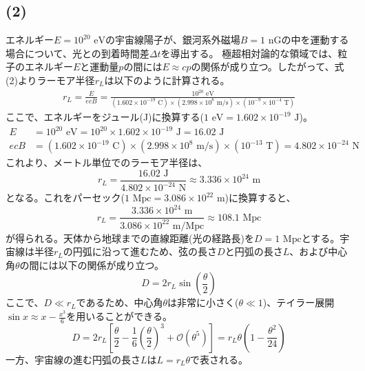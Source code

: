 \documentclass[a4paper,11pt]{jsarticle}
\begin{document}
\subsection*{(2)}
エネルギー$E = 10^{20}\text{ eV}$の宇宙線陽子が、銀河系外磁場$B = 1\text{ nG}$の中を運動する場合について、光との到着時間差$\Delta t$を導出する。
極超相対論的な領域では、粒子のエネルギー$E$と運動量$p$の間には$E \approx c p$の関係が成り立つ。したがって、式(2)よりラーモア半径$r_L$は以下のように計算される。
\begin{align}
    r_L = \frac{E}{e c B} = \frac{10^{20}\text{ eV}}{(1.602 \times 10^{-19}\text{ C}) \times (2.998 \times 10^8\text{ m/s}) \times (10^{-9} \times 10^{-4}\text{ T})}
\end{align}
ここで、エネルギーをジュール(J)に換算する($1\text{ eV} = 1.602 \times 10^{-19}\text{ J}$)。
\begin{align}
    E &= 10^{20}\text{ eV} = 10^{20} \times 1.602 \times 10^{-19}\text{ J} = 16.02\text{ J} \\
    e c B &= (1.602 \times 10^{-19}\text{ C}) \times (2.998 \times 10^8\text{ m/s}) \times (10^{-13}\text{ T}) = 4.802 \times 10^{-24}\text{ N}
\end{align}
これより、メートル単位でのラーモア半径は、
\begin{equation}
    r_L = \frac{16.02\text{ J}}{4.802 \times 10^{-24}\text{ N}} \approx 3.336 \times 10^{24}\text{ m}
\end{equation}
となる。これをパーセック($1\text{ Mpc} = 3.086 \times 10^{22}\text{ m}$)に換算すると、
\begin{equation}
    r_L = \frac{3.336 \times 10^{24}\text{ m}}{3.086 \times 10^{22}\text{ m/Mpc}} \approx 108.1\text{ Mpc}
\end{equation}
が得られる。天体から地球までの直線距離(光の経路長)を$D = 1\text{ Mpc}$とする。宇宙線は半径$r_L$の円弧に沿って進むため、弦の長さ$D$と円弧の長さ$L$、および中心角$\theta$の間には以下の関係が成り立つ。
\begin{equation}
    D = 2 r_L \sin\left(\frac{\theta}{2}\right)
\end{equation}
ここで、$D \ll r_L$であるため、中心角$\theta$は非常に小さく($\theta \ll 1$)、テイラー展開$\sin x \approx x - \frac{x^3}{6}$を用いることができる。
\begin{equation}
    D = 2 r_L \left[ \frac{\theta}{2} - \frac{1}{6}\left(\frac{\theta}{2}\right)^3 + \mathcal{O}(\theta^5) \right] = r_L \theta \left( 1 - \frac{\theta^2}{24} \right)
\end{equation}
一方、宇宙線の進む円弧の長さ$L$は$L = r_L \theta$で表される。
\end{document}
